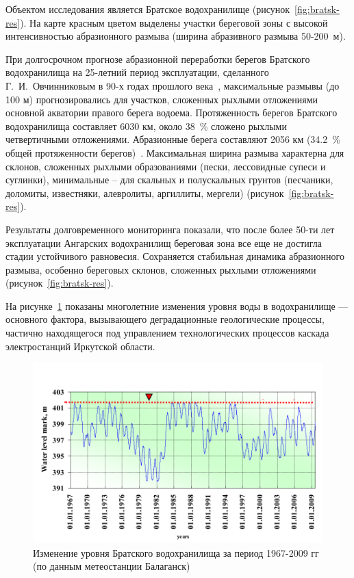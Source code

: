 \documentclass[732,14pt,final]{studrep}
\begin{document}
Объектом исследования является Братское водохранилище (рисунок~\ref{fig:bratsk-res}). На карте красным цветом выделены участки береговой зоны с высокой интенсивностью абразионного размыва (ширина абразивного размыва 50-200~м).

При долгосрочном прогнозе абразионной переработки берегов Братского водохранилища на 25-летний период эксплуатации, сделанного Г.~И.~Овчинниковым в 90-х годах прошлого века~\cite{ovch99}, максимальные размывы (до 100 м) прогнозировались для участков, сложенных рыхлыми отложениями основной акватории правого берега водоема.
Протяженность берегов Братского водохранилища составляет 6030 км, около 38~\% сложено рыхлыми четвертичными отложениями. Абразионные берега составляют 2056 км (34.2~\% общей протяженности берегов)~\cite{ovch03}. Максимальная ширина размыва характерна для склонов, сложенных рыхлыми образованиями (пески, лессовидные супеси и суглинки), минимальные – для скальных и полускальных грунтов (песчаники, доломиты, известняки, алевролиты, аргиллиты, мергели) (рисунок~\ref{fig:bratsk-res}).

Результаты долговременного мониторинга показали, что после более 50-ти лет эксплуатации Ангарских водохранилищ береговая зона все еще не достигла стадии устойчивого равновесия.  Сохраняется стабильная динамика абразионного размыва, особенно береговых склонов, сложенных рыхлыми отложениями (рисунок~\ref{fig:bratsk-res}).


На рисунке~\ref{fig:water-level} показаны многолетние изменения уровня воды в  водохранилище — основного фактора, вызывающего деградационные геологические процессы, частично находящегося под управлением технологических процессов каскада электростанций Иркутской области.

  \begin{figure}[htp]
	\centering
    \includegraphics[width=\linewidth]{pics/image17.png}
    \caption{Изменение уровня Братского водохранилища за период 1967-2009 гг (по данным метеостанции Балаганск)}
    \label{fig:water-level}
  \end{figure}
\end{document}
